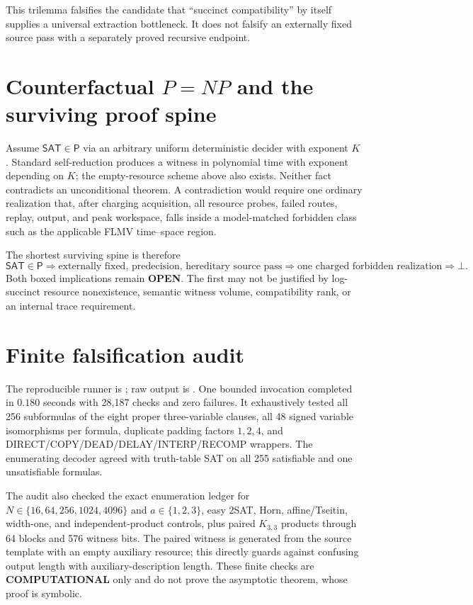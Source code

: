 \documentclass[11pt]{article}
\newcommand{\SAT}{\mathsf{SAT}}
\newcommand{\OPEN}{\textbf{OPEN}}
\newcommand{\COMP}{\textbf{COMPUTATIONAL}}
\begin{document}
This trilemma falsifies the candidate that ``succinct compatibility'' by itself supplies a universal extraction bottleneck.  It does not falsify an externally fixed source pass with a separately proved recursive endpoint.

\section{Counterfactual $P=NP$ and the surviving proof spine}

Assume $\SAT\in\mathsf P$ via an arbitrary uniform deterministic decider with exponent $K$.  Standard self-reduction produces a witness in polynomial time with exponent depending on $K$; the empty-resource scheme above also exists.  Neither fact contradicts an unconditional theorem.  A contradiction would require one ordinary realization that, after charging acquisition, all resource probes, failed routes, replay, output, and peak workspace, falls inside a model-matched forbidden class such as the applicable FLMV time--space region.

The shortest surviving spine is therefore
\[
\SAT\in\mathsf P
\Longrightarrow
\boxed{\text{externally fixed, predecision, hereditary source pass}}
\Longrightarrow
\boxed{\text{one charged forbidden realization}}
\Longrightarrow\bot.
\]
Both boxed implications remain \OPEN.  The first may not be justified by log-succinct resource nonexistence, semantic witness volume, compatibility rank, or an internal trace requirement.

\section{Finite falsification audit}

The reproducible runner is
; raw output is
.  One bounded invocation completed in $0.180$ seconds with 28,187 checks and zero failures.  It exhaustively tested all 256 subformulas of the eight proper three-variable clauses, all 48 signed variable isomorphisms per formula, duplicate padding factors $1,2,4$, and DIRECT/COPY/DEAD/DELAY/INTERP/RECOMP wrappers.  The enumerating decoder agreed with truth-table SAT on all 255 satisfiable and one unsatisfiable formulas.

The audit also checked the exact enumeration ledger for $N\in\{16,64,256,1024,4096\}$ and $a\in\{1,2,3\}$, easy 2SAT, Horn, affine/Tseitin, width-one, and independent-product controls, plus paired $K_{3,3}$ products through 64 blocks and 576 witness bits.  The paired witness is generated from the source template with an empty auxiliary resource; this directly guards against confusing output length with auxiliary-description length.  These finite checks are \COMP{} only and do not prove the asymptotic theorem, whose proof is symbolic.
\end{document}
